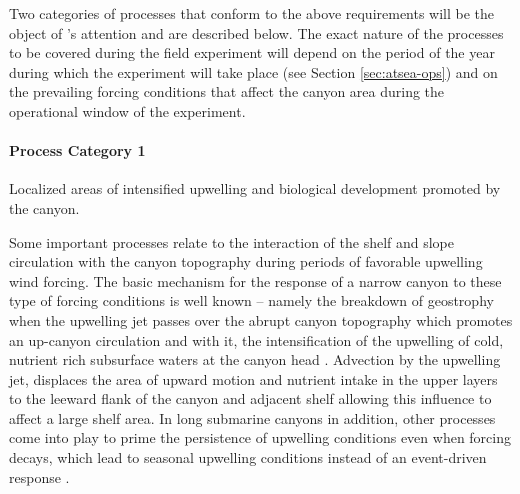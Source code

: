  
Two categories of processes that conform to the above requirements
will be the object of \proje's attention and are described below. The
exact nature of the processes to be covered during the field
experiment will depend on the period of the year during which the
experiment will take place (see Section \ref{sec:atsea-ops}) and on
the prevailing forcing conditions that affect the \naz canyon area
during the operational window of the experiment.

  
\paragraph{Process Category 1} Localized areas of intensified
upwelling and biological development promoted by the canyon.

Some important processes relate to the interaction of the shelf and
slope circulation with the canyon topography during periods of
favorable upwelling wind forcing. The basic mechanism for the response
of a narrow canyon to these type of forcing conditions is well known
-- namely the breakdown of geostrophy when the upwelling jet passes
over the abrupt canyon topography which promotes an up-canyon
circulation and with it, the intensification of the upwelling of cold,
nutrient rich subsurface waters at the canyon head
\cite{klinck96,she00}. Advection by the upwelling jet, displaces the
area of upward motion and nutrient intake in the upper layers to the
leeward flank of the canyon and adjacent shelf allowing this influence
to affect a large shelf area. In long submarine canyons in addition,
other processes come into play to prime the persistence of upwelling
conditions even when forcing decays, which lead to seasonal upwelling
conditions instead of an event-driven response
\cite{allen00,waterhouse09}.

